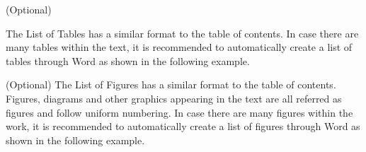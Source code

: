 \tableofcontents
\onehalfspacing
\setlength{\parskip}{5pt plus 1pt minus 1pt}

\newpage
(Optional)

The List of Tables has a similar format to the table of contents. In case there are many tables within the text, it is recommended to automatically create a list of tables through Word as shown in the following example.


\listoftables
\onehalfspacing
\setlength{\parskip}{5pt plus 1pt minus 1pt}

\newpage
(Optional)
The List of Figures has a similar format to the table of contents.
Figures, diagrams and other graphics appearing in the text are all referred as figures and follow uniform numbering.
In case there are many figures within the work, it is recommended to automatically create a list of figures through Word as shown in the following example.

\listoffigures
\onehalfspacing
\setlength{\parskip}{5pt plus 1pt minus 1pt}

